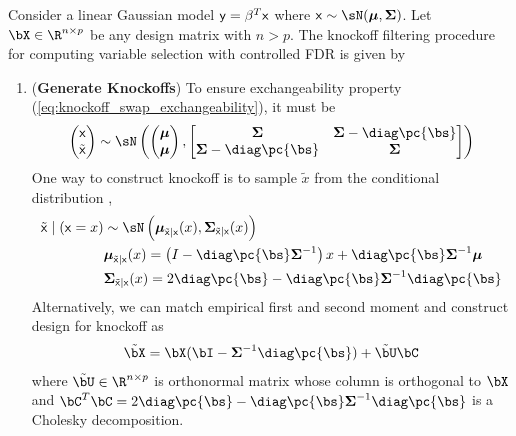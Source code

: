 \documentclass[11pt]{article}
\begin{document}
Consider a linear Gaussian model $\mathsf{y} = \beta^T\mathsf{x}$ where $\rx\sim\sN(\bmu,\bSigma)$. Let $\bX \in\R^{n\times p}$ be any design matrix with $n>p$. The knockoff filtering procedure for computing variable selection with controlled FDR is given by
\begin{enumerate}
    \item (\textbf{Generate Knockoffs}) 
    To ensure exchangeability property (\ref{eq:knockoff_swap_exchangeability}), it must be
    \begin{align*}
        \begin{pmatrix}
            \rx \\
            \tilde{\rx}
        \end{pmatrix}            
            \sim \sN\left(
                \begin{pmatrix}
                    \bmu \\ 
                    \bmu \\
                \end{pmatrix}, 
                \begin{bmatrix}
                    \bSigma & \bSigma - \diag\pc{\bs} \\
                    \bSigma - \diag\pc{\bs} & \bSigma \\
                \end{bmatrix}\right)
    \end{align*}
    One way to construct knockoff is to sample $\tilde{x}$ from the conditional distribution \cite{candesPanningGoldModelX2017,gimenezKnockoffsMassNew2019},
    \begin{align*}
        \tilde{\rx} \mid (\rx = x)
            &\sim \sN\left(
                \bmu_{\tilde{\rx}|\rx}(x), \bSigma_{\tilde{\rx}|\rx}(x)
            \right) \\
        &\bmu_{\tilde{\rx}|\rx}(x) 
            = \left (I - \diag\pc{\bs}\bSigma^{-1}\right) x + \diag\pc{\bs}\bSigma^{-1} \bmu\\
        &\bSigma_{\tilde{\rx}|\rx}(x)
            = 2\diag\pc{\bs} - \diag\pc{\bs}\bSigma^{-1}\diag\pc{\bs}
    \end{align*}
    Alternatively, we can match empirical first and second moment \cite{barberControllingFalseDiscovery2015} and construct design for knockoff as 
    \begin{align*}
        \tilde{\bX}
            = \bX(\bI - \bSigma^{-1}\diag\pc{\bs}) + \tilde{\bU}\bC
    \end{align*}
    where $\tilde{\bU}\in\R^{n\times p}$ is orthonormal matrix whose column is orthogonal to $\bX$ and $\bC^T\bC = 2\diag\pc{\bs} - \diag\pc{\bs}\bSigma^{-1}\diag\pc{\bs}$ is a Cholesky decomposition.

\end{enumerate}
\end{document}
